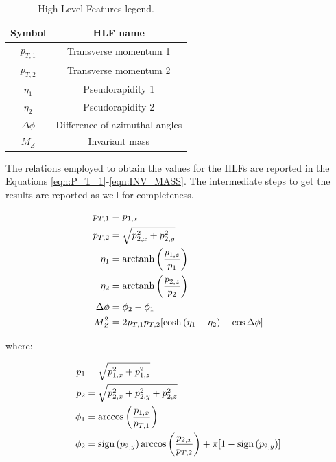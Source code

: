 \begin{table}[H]
	\begin{center}
		\begin{tabular}{c c}
			\toprule
			\toprule
			Symbol	&	HLF name	\\
			\midrule
			$p_{T,1}$		&	Transverse momentum 1			\\
			$p_{T,2}$		&	Transverse momentum 2			\\
			$\eta_{1}$		&	Pseudorapidity 1				\\
			$\eta_{2}$		&	Pseudorapidity 2				\\
			$\Delta \phi$	&	Difference of azimuthal angles	\\
			$M_{Z}$			&	Invariant mass					\\
			\bottomrule
			\bottomrule
		\end{tabular}
		\caption{High Level Features legend.}
		\label{tab:HLF}
	\end{center}
\end{table}

The relations employed to obtain the values for the HLFs are reported in the Equations \ref{eqn:P_T_1}-\ref{eqn:INV_MASS}. The intermediate steps to get the results are reported as well for completeness\footnotemark.

\begin{align}
	p_{T,1} &= p_{1,x}	\label{eqn:P_T_1}	\\
	p_{T,2} &= \sqrt{ p_{2,x}^2 + p_{2,y}^2 }	\label{eqn:P_T_2}	\\
	\eta_{1} &= \operatorname{arctanh}{ \left( \frac{p_{1,z}}{p_{1}} \right) }	\label{eqn:PR_1}	\\
	\eta_{2} &= \operatorname{arctanh}{ \left( \frac{p_{2,z}}{p_{2}} \right) }	\label{eqn:PR_2}	\\
	\Delta \phi &= \phi_{2} - \phi_{1}	\label{eqn:DELTA_PHI}	\\
	M_{Z}^{2} &= 2 p_{T,1} p_{T,2} [ \cosh{(\eta_{1} - \eta_{2})} - \cos{\Delta \phi} ]	\label{eqn:INV_MASS}
\end{align}

\noindent
where:

\begin{align}
	p_{1} &= \sqrt{ p_{1,x}^2 + p_{1,z}^2 }	\\
	p_{2} &= \sqrt{ p_{2,x}^2 + p_{2,y}^2 + p_{2,z}^2 }	\\
	\phi_{1} &= \arccos{ \left( \frac{p_{1,x}}{p_{T,1}} \right) }	\\
	\phi_{2} &= \operatorname{sign}{(p_{2,y})} \arccos{ \left( \frac{p_{2,x}}{p_{T,2}} \right) } + \pi [1 - \operatorname{sign}{(p_{2,y})}]
\end{align}





